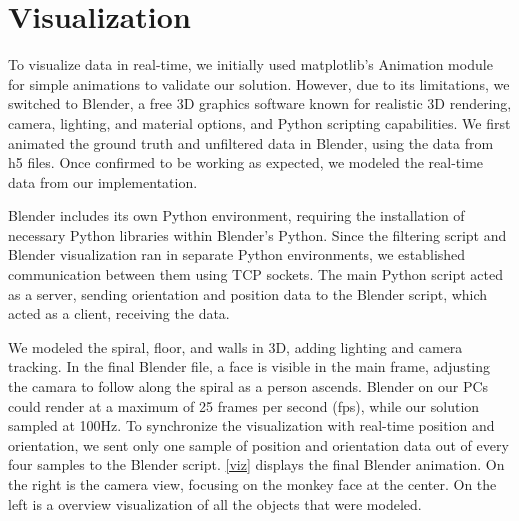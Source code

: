 \noindent\small
\begin{table}[h!]
\centering
{}
\caption{Structure of \texttt{RssiDataEntry} (Size: 256 bytes).}
\label{tab:rssidatadataentry}
\end{table}

\par

\section{Visualization}

To visualize data in real-time, we initially used matplotlib's Animation module for simple animations to validate our solution. However, due to its limitations, we switched to Blender, a free 3D graphics software known for realistic 3D rendering, camera, lighting, and material options, and Python scripting capabilities. 
We first animated the ground truth and unfiltered data in Blender, using the data from h5 files. Once confirmed to be working as expected, we modeled the real-time data from our implementation.
\par
Blender includes its own Python environment, requiring the installation of necessary Python libraries within Blender's Python. Since the filtering script and Blender visualization ran in separate Python environments, we established communication between them using TCP sockets. The main Python script acted as a server, sending orientation and position data to the Blender script, which acted as a client, receiving the data.
\par
We modeled the spiral, floor, and walls in 3D, adding lighting and camera tracking. In the final Blender file, a face is visible in the main frame, adjusting the camara to follow along the spiral as a person ascends.
Blender on our PCs could render at a maximum of 25 frames per second (fps), while our solution sampled at 100Hz. To synchronize the visualization with real-time position and orientation, we sent only one sample of position and orientation data out of every four samples to the Blender script.
\cref{viz} displays the final Blender animation. On the right is the camera view, focusing on the monkey face at the center. On the left is a overview visualization of all the objects that were modeled.

